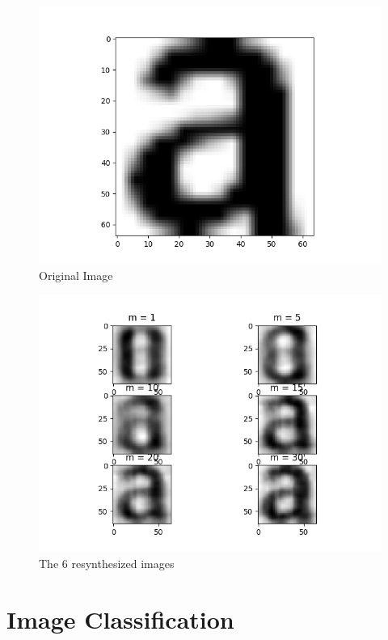 \documentclass{article}
\begin{document}
\begin{figure}[H]
    \centering
    \includegraphics[width=1\textwidth]{../original-image.png}
    \caption{Original Image}
\end{figure}
\begin{figure}[H]
    \centering
    \includegraphics[width=1\textwidth]{../resynthesized-images.png}
    \caption{The 6 resynthesized images}
\end{figure}

\section{Image Classification}
\end{document}
